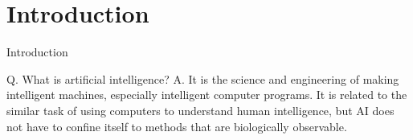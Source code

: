 \documentclass{beamer}
\begin{document}

\section{Introduction}
\label{sec:Introduction}
\begin{frame}{Introduction}

{\large Q. What is artificial intelligence?}
\newline\newline
{\large A. It is the science and engineering of making intelligent machines, especially intelligent computer programs. \newline\newline It is related to the similar task of using computers to understand human intelligence, but AI does not have to confine itself to methods that are biologically observable.}
\end{frame}
\end{document}
